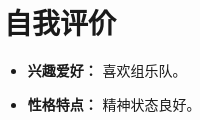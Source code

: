 \documentclass[11pt]{article}
\newlength{\iconwidth}
\begin{document}
    \vspace{1em}
    
    \begin{minipage}[t]{\textwidth}
        \section[自我评价]{\makebox[\iconwidth][c]{\color{primary_color}{\faComments}}\quad 自我评价}
        \begin{itemize}
            \setlength{\itemsep}{0.5em}
            \item \textbf{兴趣爱好：} 喜欢组乐队。
            \item \textbf{性格特点：} 精神状态良好。
        \end{itemize}
    \end{minipage}
\end{document}
